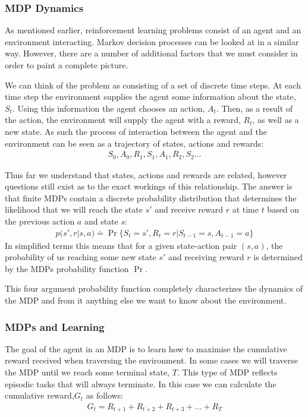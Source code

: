 \subsubsection{MDP Dynamics}

As mentioned earlier, reinforcement learning problems consist of an agent and an environment interacting.
Markov decision processes can be looked at in a similar way.
However, there are a number of additional factors that we must consider in order to paint a complete picture.

We can think of the problem as consisting of a set of discrete time steps.
At each time step the environment supplies the agent some information about the state, $S_t$.
Using this information the agent chooses an action, $A_t$.
Then, as a result of the action, the environment will supply the agent with a reward, $R_t$, as well as a new state.
As such the process of interaction between the agent and the environment can be seen as a trajectory of states,
actions and rewards\citep{sutton1998reinforcement}:
\begin{align}
    S_0,A_0,R_1,S_1,A_1,R_2,S_2\dots
\end{align}

Thus far we understand that states, actions and rewards are related, however questions still exist as to
the exact workings of this relationship.
The answer is that finite MDPs contain a discrete probability distribution that determines the likelihood that we
will reach the state $s'$ and receive reward $r$ at time $t$ based on the previous action $a$ and state $s$:
\begin{align}
    p(s',r|s,a) \doteq \Pr\{S_t=s',R_t=r|S_{t-1}=s,A_{t-1}=a\}
\end{align}
In simplified terms this means that for a given state-action pair $(s,a)$, the probability of us reaching some
new state $s'$ and receiving reward $r$ is determined by the MDPs probability function $\Pr$.

This four argument probability function completely characterizes the dynamics of the MDP and from it anything
else we want to know about the environment\citep{sutton1998reinforcement}.

\subsubsection{MDPs and Learning}
The goal of the agent in an MDP is to learn how to maximise the cumulative reward received when traversing
the environment.
In some cases we will traverse the MDP until we reach some terminal state, $T$.
This type of MDP reflects episodic tasks that will always terminate.
In this case we can calculate the cumulative reward,$G_t$ as follows:
\begin{align}
    G_t = R_{t+1}+R_{t+2}+R_{t+3}+\dots+R_T
\end{align}

